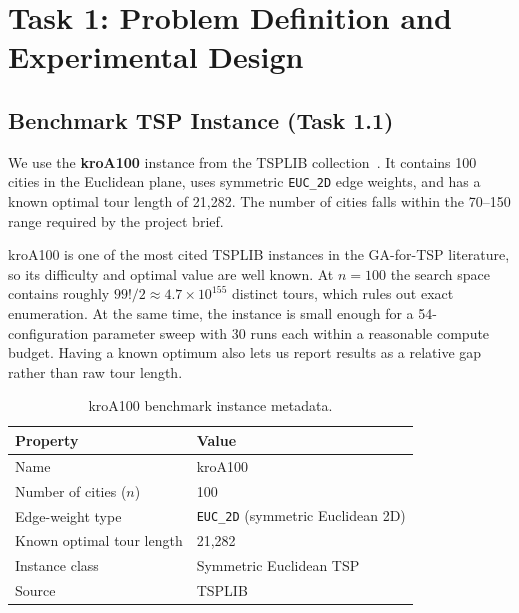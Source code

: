 \chapter{Task 1: Problem Definition and Experimental Design}
\label{Task1}

\section{Benchmark TSP Instance (Task 1.1)}
\label{T1:Benchmark}

We use the \textbf{kroA100} instance from the TSPLIB
collection~\cite{reinelt1991tsplib,applegate2006traveling}. It contains 100
cities in the Euclidean plane, uses symmetric \texttt{EUC\_2D} edge weights,
and has a known optimal tour length of 21{,}282. The number of cities falls within
the 70--150 range required by the project brief.

kroA100 is one of the most cited TSPLIB instances in the GA-for-TSP
literature, so its difficulty and optimal value are well known. At
$n=100$ the search space contains roughly $99!/2 \approx 4.7\times10^{155}$
distinct tours, which rules out exact enumeration. At the same time, the
instance is small enough for a 54-configuration parameter sweep with
30 runs each within a reasonable compute budget. Having a known optimum also
lets us report results as a relative gap rather than raw tour length.

\begin{table}[htbp]
	\centering
	\caption{kroA100 benchmark instance metadata.}
	\label{tab:instance}
	\begin{tabular}{ll}
		\hline
		\textbf{Property} & \textbf{Value} \\
		\hline
		Name & kroA100 \\
		Number of cities ($n$) & 100 \\
		Edge-weight type & \texttt{EUC\_2D} (symmetric Euclidean 2D) \\
		Known optimal tour length & 21{,}282 \\
		Instance class & Symmetric Euclidean TSP \\
		Source & TSPLIB~\cite{reinelt1991tsplib,applegate2006traveling} \\
		\hline
	\end{tabular}
\end{table}

